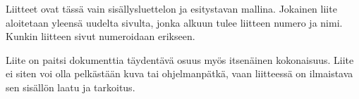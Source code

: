 \documentclass[finnish,gradu]{tktltiki}
\begin{document}
\lastpage

\appendices

\pagestyle{empty}


Liitteet ovat tässä vain sisällysluettelon ja esitystavan mallina.
Jokainen liite aloitetaan yleensä uudelta sivulta, jonka alkuun tulee
liitteen numero ja nimi. Kunkin liitteen sivut numeroidaan erikseen.

Liite on paitsi dokumenttia täydentävä osuus myös itsenäinen
kokonaisuus. Liite ei siten voi olla pelkästään kuva tai ohjelmanpätkä,
vaan liitteessä on ilmaistava sen sisällön laatu ja tarkoitus.
\end{document}
